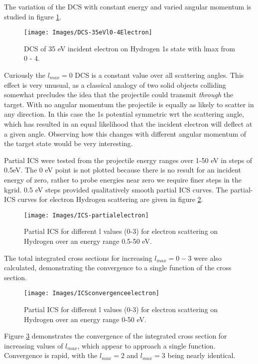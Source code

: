 \documentclass{article}
\begin{document}
    The variation of the DCS with constant energy and varied angular momentum is studied in figure \ref{35evl0-3}.
    
    \begin{figure}[H]
    	\centering
    	\texttt{[image: Images/DCS-35eVl0-4Electron]}
    	\caption{DCS of 35 eV incident electron on Hydrogen 1s state with lmax from 0 - 4. \label{35evl0-3}}
    \end{figure}
    
    Curiously the $l_{max}=0$ DCS is a constant value over all scattering angles. This effect is very unusual, as a classical analogy of two solid objects colliding somewhat precludes the idea that the projectile could transmit \textit{through} the target. With no angular momentum the projectile is equally as likely to scatter in any direction. In this case the 1s potential symmetric wrt the scattering angle, which has resulted in an equal likelihood that the incident electron will deflect at a given angle. Observing how this changes with different angular momentum of the target state would be very interesting. 
    
    Partial ICS were tested from the projectile energy ranges over 1-50 eV in steps of 0.5eV. The 0 eV point is not plotted because there is no result for an incident energy of zero, rather to probe energies near zero we require finer steps in the kgrid. 0.5 eV steps provided qualitatively smooth partial ICS curves. The partial-ICS curves for electron Hydrogen scattering are given in figure \ref{partialelectron}.
    
    \begin{figure}[H]
    	\centering
    	\texttt{[image: Images/ICS-partialelectron]}
    	\caption{Partial ICS for different l values (0-3) for electron scattering on Hydrogen over an energy range 0.5-50 eV. \label{partialelectron}}
    \end{figure}
    
     The total integrated cross sections for increasing $l_{max} = 0-3$ were also calculated, demonstrating the convergence to a single function of the cross section.
     
     \begin{figure}[H]
     	\centering
     	\texttt{[image: Images/ICSconvergenceelectron]}
     	\caption{Partial ICS for different l values (0-3) for electron scattering on Hydrogen over an energy range 0-50 eV. \label{totalelectron}}
     \end{figure}
     Figure \ref{totalelectron} demonstrates the convergence of the integrated cross section for increasing values of $l_{max}$, which appear to approach a single function. Convergence is rapid, with the $l_{max}=2$ and $l_{max}=3$ being nearly identical. 
\end{document}
